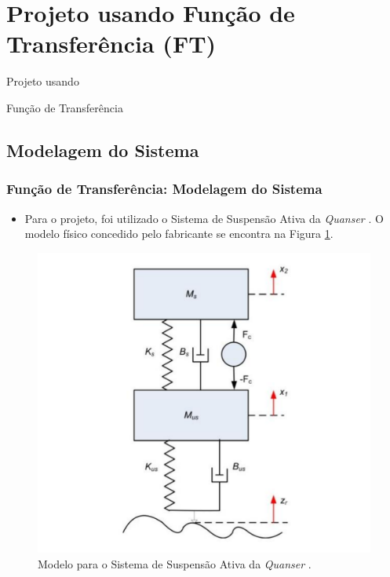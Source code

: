 \documentclass{beamer}
\begin{document}
\section{Projeto usando Função de Transferência (FT)}
\begin{frame}
\Huge{\centerline{Projeto usando}}
\Huge{\centerline{Função de Transferência}}
\end{frame}
\subsection{Modelagem do Sistema}
\begin{frame}
\frametitle{Função de Transferência: Modelagem do Sistema}
\begin{itemize}
\item Para o projeto, foi utilizado o Sistema de Suspensão Ativa da \textit{Quanser} \cite{quanser}. O modelo físico concedido pelo fabricante se encontra na Figura \ref{suspensao}.
\end{itemize}

\begin{figure}[H]
  \centering
  \includegraphics[width=.5\columnwidth]{./imagens/suspensao.pdf}
    \renewcommand{\figurename}{Fig. 1}
  \caption{Modelo para o Sistema de Suspensão Ativa da \textit{Quanser} \protect\cite{quanser}.}
  \label{suspensao}
\end{figure}
\end{frame}
\end{document}
